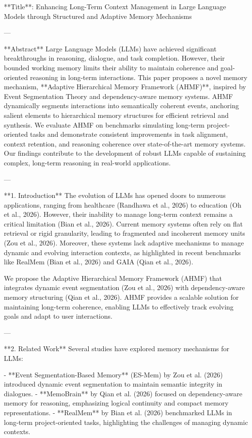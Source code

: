 **Title**: Enhancing Long-Term Context Management in Large Language Models through Structured and Adaptive Memory Mechanisms

---

**Abstract**  
Large Language Models (LLMs) have achieved significant breakthroughs in reasoning, dialogue, and task completion. However, their bounded working memory limits their ability to maintain coherence and goal-oriented reasoning in long-term interactions. This paper proposes a novel memory mechanism, **Adaptive Hierarchical Memory Framework (AHMF)**, inspired by Event Segmentation Theory and dependency-aware memory systems. AHMF dynamically segments interactions into semantically coherent events, anchoring salient elements to hierarchical memory structures for efficient retrieval and synthesis. We evaluate AHMF on benchmarks simulating long-term project-oriented tasks and demonstrate consistent improvements in task alignment, context retention, and reasoning coherence over state-of-the-art memory systems. Our findings contribute to the development of robust LLMs capable of sustaining complex, long-term reasoning in real-world applications.

---

**1. Introduction**  
The evolution of LLMs has opened doors to numerous applications, ranging from healthcare (Randhawa et al., 2026) to education (Oh et al., 2026). However, their inability to manage long-term context remains a critical limitation (Bian et al., 2026). Current memory systems often rely on flat retrieval or rigid granularity, leading to fragmented and incoherent memory units (Zou et al., 2026). Moreover, these systems lack adaptive mechanisms to manage dynamic and evolving interaction contexts, as highlighted in recent benchmarks like RealMem (Bian et al., 2026) and GAIA (Qian et al., 2026).

We propose the Adaptive Hierarchical Memory Framework (AHMF) that integrates dynamic event segmentation (Zou et al., 2026) with dependency-aware memory structuring (Qian et al., 2026). AHMF provides a scalable solution for maintaining long-term coherence, enabling LLMs to effectively track evolving goals and adapt to user interactions.

---

**2. Related Work**  
Several studies have explored memory mechanisms for LLMs:  

- **Event Segmentation-Based Memory** (ES-Mem) by Zou et al. (2026) introduced dynamic event segmentation to maintain semantic integrity in dialogues.  
- **MemoBrain** by Qian et al. (2026) focused on dependency-aware memory for reasoning, emphasizing logical continuity and compact memory representations.  
- **RealMem** by Bian et al. (2026) benchmarked LLMs in long-term project-oriented tasks, highlighting the challenges of managing dynamic contexts.  

